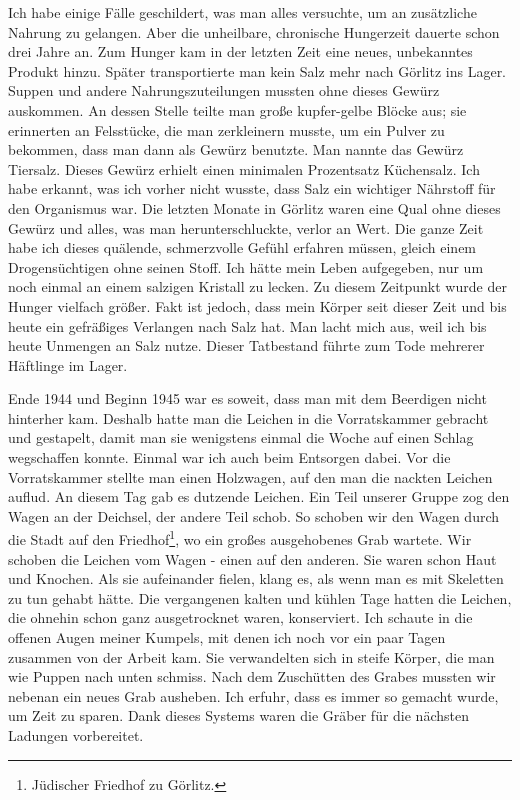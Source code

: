Ich habe einige Fälle geschildert, was man alles versuchte, um an zusätzliche Nahrung zu gelangen. Aber die unheilbare, chronische Hungerzeit dauerte schon drei Jahre an. Zum Hunger kam in der letzten Zeit eine neues, unbekanntes Produkt hinzu. Später transportierte man kein Salz mehr nach Görlitz ins Lager. Suppen und andere Nahrungszuteilungen mussten ohne dieses Gewürz auskommen. An dessen Stelle teilte man große kupfer-gelbe Blöcke aus; sie erinnerten an Felsstücke, die man zerkleinern musste, um ein Pulver zu bekommen, dass man dann als Gewürz benutzte. Man nannte das Gewürz Tiersalz. Dieses Gewürz erhielt einen minimalen Prozentsatz Küchensalz. Ich habe erkannt, was ich vorher nicht wusste, dass Salz ein wichtiger Nährstoff für den Organismus war. Die letzten Monate in Görlitz waren eine Qual ohne dieses Gewürz und alles, was man herunterschluckte, verlor an Wert. Die ganze Zeit habe ich dieses quälende, schmerzvolle Gefühl erfahren müssen, gleich einem Drogensüchtigen ohne seinen Stoff. Ich hätte mein Leben aufgegeben, nur um noch einmal an einem salzigen  Kristall zu lecken. Zu diesem Zeitpunkt wurde der Hunger vielfach größer. Fakt ist jedoch, dass mein Körper seit dieser Zeit und bis heute ein gefräßiges Verlangen nach Salz hat. Man lacht mich aus, weil ich bis heute Unmengen an Salz nutze. Dieser Tatbestand führte zum Tode mehrerer Häftlinge im Lager. 


Ende 1944 und Beginn 1945 war es soweit, dass man mit dem Beerdigen nicht hinterher kam. Deshalb hatte man die Leichen in die Vorratskammer gebracht und gestapelt, damit man sie wenigstens einmal die Woche auf einen Schlag wegschaffen konnte. Einmal war ich auch beim Entsorgen dabei. Vor die Vorratskammer stellte man einen Holzwagen, auf den man die nackten Leichen auflud. An diesem Tag gab es dutzende Leichen. Ein Teil unserer Gruppe zog den Wagen an der Deichsel, der andere Teil schob. So schoben wir den Wagen durch die Stadt auf den Friedhof\footnote{Jüdischer Friedhof zu Görlitz.}, wo ein großes ausgehobenes Grab wartete. Wir schoben die Leichen vom Wagen - einen auf den anderen. Sie waren schon Haut und Knochen. Als sie aufeinander fielen, klang es, als wenn man es mit Skeletten zu tun gehabt hätte. Die vergangenen kalten und kühlen Tage hatten die Leichen, die ohnehin schon ganz ausgetrocknet waren, konserviert. Ich schaute in die offenen Augen meiner Kumpels, mit denen ich noch vor ein paar Tagen zusammen von der Arbeit kam. Sie verwandelten sich in steife Körper, die man wie Puppen nach unten schmiss. Nach dem Zuschütten des Grabes mussten wir nebenan ein neues Grab ausheben. Ich erfuhr, dass es immer so gemacht wurde, um Zeit zu sparen. Dank dieses Systems waren die Gräber für die nächsten Ladungen vorbereitet.

